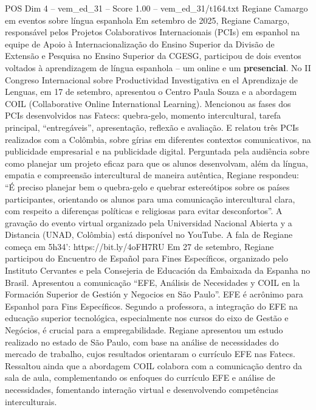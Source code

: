 \begin{textsample}{POS Dim 4 – vem\_ed\_31 – Score 1.00 – vem\_ed\_31/t164.txt}  \label{ex:f4_pos_146}
Regiane Camargo em eventos sobre língua espanhola Em setembro de 2025, Regiane Camargo, responsável pelos Projetos Colaborativos Internacionais (PCIs) em espanhol na equipe de Apoio à Internacionalização do Ensino Superior da Divisão de Extensão e Pesquisa no Ensino Superior da CGESG, participou de dois eventos voltados à aprendizagem de língua espanhola – um online e um \textbf{presencial}.
No II Congreso Internacional sobre Productividad Investigativa en el Aprendizaje de Lenguas, em 17 de setembro, apresentou o Centro Paula Souza e a abordagem COIL (Collaborative Online International Learning).
Mencionou as fases dos PCIs desenvolvidos nas Fatecs: quebra-gelo, momento intercultural, tarefa principal, “entregáveis”, apresentação, reflexão e avaliação.
E relatou três PCIs realizados com a Colômbia, sobre gírias em diferentes contextos comunicativos, na publicidade empresarial e na publicidade digital.
Perguntada pela audiência sobre como planejar um projeto eficaz para que os alunos desenvolvam, além da língua, empatia e compreensão intercultural de maneira autêntica, Regiane respondeu: “É preciso planejar bem o quebra-gelo e quebrar estereótipos sobre os países participantes, orientando os alunos para uma comunicação intercultural clara, com respeito a diferenças políticas e religiosas para evitar desconfortos”.
A gravação do evento virtual organizado pela Universidad Nacional Abierta y a Distancia (UNAD, Colômbia) está disponível no YouTube.
A fala de Regiane começa em 5h34’: https://bit.ly/4oFH7RU Em 27 de setembro, Regiane participou do Encuentro de Español para Fines Específicos, organizado pelo Instituto Cervantes e pela Consejeria de Educación da Embaixada da Espanha no Brasil.
Apresentou a comunicação “EFE, Análisis de Necesidades y COIL en la Formación Superior de Gestión y Negocios en São Paulo”.
EFE é acrônimo para Espanhol para Fins Específicos.
Segundo a professora, a integração do EFE na educação superior tecnológica, especialmente nos cursos do eixo de Gestão e Negócios, é crucial para a empregabilidade.
Regiane apresentou um estudo realizado no estado de São Paulo, com base na análise de necessidades do mercado de trabalho, cujos resultados orientaram o currículo EFE nas Fatecs.
Ressaltou ainda que a abordagem COIL colabora com a comunicação dentro da sala de aula, complementando os enfoques do currículo EFE e análise de necessidades, fomentando interação virtual e desenvolvendo competências interculturais.

\end{textsample}
